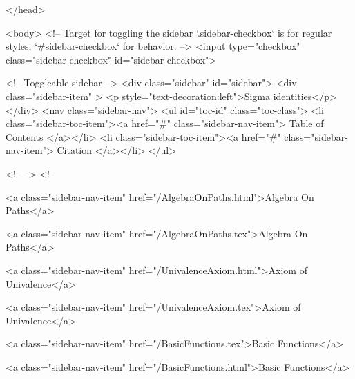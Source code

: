   
</head>




  <body>
    <!-- Target for toggling the sidebar `.sidebar-checkbox` is for regular
     styles, `#sidebar-checkbox` for behavior. -->
<input type="checkbox" class="sidebar-checkbox" id="sidebar-checkbox">

<!-- Toggleable sidebar -->
<div class="sidebar" id="sidebar">
  <div class="sidebar-item" >
    <p style="text-decoration:left">Sigma identities</p>
  </div>
  <nav class="sidebar-nav">
    <ul id="toc-id" class="toc-class">
  <li class="sidebar-toc-item"><a href="#" class="sidebar-nav-item"> Table of Contents </a></li>
  <li class="sidebar-toc-item"><a href="#" class="sidebar-nav-item"> Citation </a></li>
</ul>


    <!--  -->
    <!-- 
      
    
      
    
      
    
      
        
      
    
      
        
          <a class="sidebar-nav-item" href="/AlgebraOnPaths.html">Algebra On Paths</a>
        
      
    
      
        
          <a class="sidebar-nav-item" href="/AlgebraOnPaths.tex">Algebra On Paths</a>
        
      
    
      
        
          <a class="sidebar-nav-item" href="/UnivalenceAxiom.html">Axiom of Univalence</a>
        
      
    
      
        
          <a class="sidebar-nav-item" href="/UnivalenceAxiom.tex">Axiom of Univalence</a>
        
      
    
      
        
          <a class="sidebar-nav-item" href="/BasicFunctions.tex">Basic Functions</a>
        
      
    
      
        
          <a class="sidebar-nav-item" href="/BasicFunctions.html">Basic Functions</a>
        
      
    
      
        
